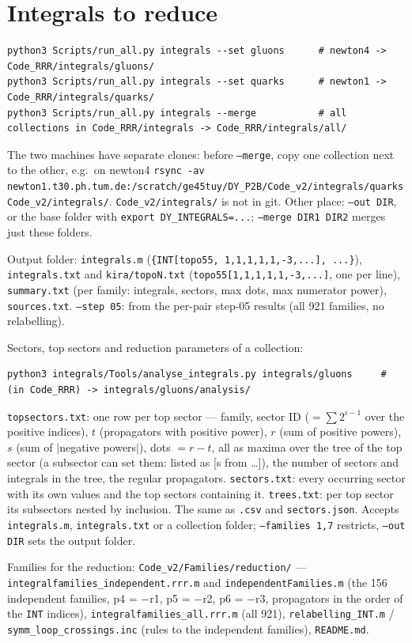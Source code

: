 \documentclass[10pt]{article}
\newcommand{\cmd}[1]{\texttt{#1}}
\begin{document}
\section{Integrals to reduce}
\begin{lstlisting}
python3 Scripts/run_all.py integrals --set gluons      # newton4 -> Code_RRR/integrals/gluons/
python3 Scripts/run_all.py integrals --set quarks      # newton1 -> Code_RRR/integrals/quarks/
python3 Scripts/run_all.py integrals --merge           # all collections in Code_RRR/integrals -> Code_RRR/integrals/all/
\end{lstlisting}
The two machines have separate clones: before \cmd{--merge}, copy one collection next to the other, e.g.\ on newton4
\cmd{rsync -av newton1.t30.ph.tum.de:/scratch/ge45tuy/DY\_P2B/Code\_v2/integrals/quarks Code\_v2/integrals/}.
\cmd{Code\_v2/integrals/} is not in git. Other place: \cmd{--out DIR}, or the base folder with
\cmd{export DY\_INTEGRALS=...}; \cmd{--merge DIR1 DIR2} merges just these folders.

Output folder: \cmd{integrals.m} (\cmd{\{INT[topo55, 1,1,1,1,1,-3,...], ...\}}), \cmd{integrals.txt} and
\cmd{kira/topoN.txt} (\cmd{topo55[1,1,1,1,1,-3,...]}, one per line), \cmd{summary.txt} (per family: integrals,
sectors, max dots, max numerator power), \cmd{sources.txt}. \cmd{--step 05}: from the per-pair step-05 results
(all 921 families, no relabelling).

Sectors, top sectors and reduction parameters of a collection:
\begin{lstlisting}
python3 integrals/Tools/analyse_integrals.py integrals/gluons     # (in Code_RRR) -> integrals/gluons/analysis/
\end{lstlisting}
\cmd{topsectors.txt}: one row per top sector --- family, sector ID ($=\sum 2^{i-1}$ over the positive indices), $t$
(propagators with positive power), $r$ (sum of positive powers), $s$ (sum of $|$negative powers$|$), dots $=r-t$, all
as maxima over the tree of the top sector (a subsector can set them: listed as [s from \ldots]), the number of
sectors and integrals in the tree, the regular propagators. \cmd{sectors.txt}: every occurring sector with its own
values and the top sectors containing it. \cmd{trees.txt}: per top sector its subsectors nested by inclusion.
The same as \cmd{.csv} and \cmd{sectors.json}. Accepts \cmd{integrals.m}, \cmd{integrals.txt} or a collection folder;
\cmd{--families 1,7} restricts, \cmd{--out DIR} sets the output folder.

Families for the reduction: \cmd{Code\_v2/Families/reduction/} --- \cmd{integralfamilies\_independent.rrr.m} and
\cmd{independentFamilies.m} (the 156 independent families, p4 = $-$r1, p5 = $-$r2, p6 = $-$r3, propagators in the
order of the \cmd{INT} indices), \cmd{integralfamilies\_all.rrr.m} (all 921), \cmd{relabelling\_INT.m} /
\cmd{symm\_loop\_crossings.inc} (rules to the independent families), \cmd{README.md}.
\end{document}
